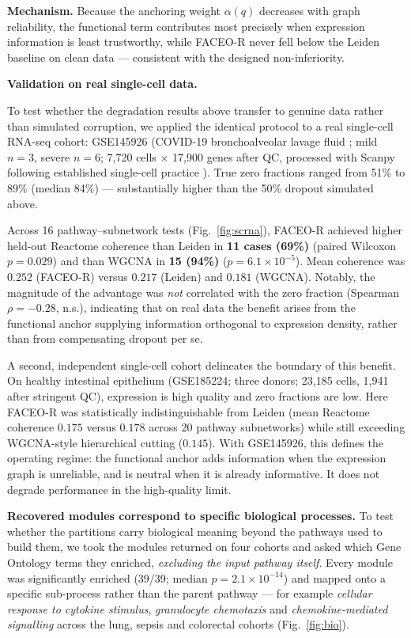 \documentclass[twocolumn,10pt,a4paper]{article}
\begin{document}
\noindent\textbf{Mechanism.} Because the anchoring weight $\alpha(q)$ decreases with graph
reliability, the functional term contributes most precisely when expression information is
least trustworthy, while FACEO-R never fell below the Leiden baseline on clean data ---
consistent with the designed non-inferiority.


\noindent\textbf{Validation on real single-cell data.} \label{sec:scrna}

To test whether the degradation results above transfer to genuine data rather than simulated
corruption, we applied the identical protocol to a real single-cell RNA-seq cohort: GSE145926
(COVID-19 bronchoalveolar lavage fluid \citep{liao2020covid}; mild $n=3$, severe $n=6$;
7{,}720 cells $\times$ 17{,}900 genes after QC, processed with Scanpy \citep{wolf2018scanpy} following established
single-cell practice \citep{luecken2019benchmark}). True zero fractions ranged
from 51\% to 89\% (median 84\%) ---
substantially higher than the 50\% dropout simulated above.

Across 16 pathway--subnetwork tests (Fig.~\ref{fig:scrna}), FACEO-R achieved higher
held-out Reactome coherence
than Leiden in \textbf{11 cases (69\%)} (paired Wilcoxon $p = 0.029$) and than WGCNA in
\textbf{15 (94\%)} ($p = 6.1\times10^{-5}$). Mean coherence was $0.252$ (FACEO-R) versus
$0.217$ (Leiden) and $0.181$ (WGCNA). Notably, the magnitude of the advantage was \emph{not}
correlated with the zero fraction (Spearman $\rho = -0.28$, n.s.), indicating that on real
data the benefit arises from the functional anchor supplying information orthogonal to
expression density, rather than from compensating dropout per se.

A second, independent single-cell cohort delineates the boundary of this benefit.
On healthy intestinal epithelium (GSE185224; three donors; 23{,}185 cells, 1{,}941 after
stringent QC), expression is high quality and zero fractions are low. Here FACEO-R was
statistically indistinguishable from Leiden
(mean Reactome coherence $0.175$ versus $0.178$ across 20 pathway subnetworks) while still
exceeding WGCNA-style hierarchical cutting ($0.145$). With GSE145926, this defines the
operating regime: the functional anchor adds information when the expression graph is
unreliable, and is neutral when it is already informative. It does not degrade performance
in the high-quality limit.

\noindent\textbf{Recovered modules correspond to specific biological processes.} To test
whether the partitions carry biological meaning beyond the pathways used to build them, we
took the modules returned on four cohorts and asked which Gene Ontology terms they enriched,
\emph{excluding the input pathway itself}. Every module was significantly enriched
(39/39; median $p = 2.1\times10^{-14}$) and mapped onto a specific sub-process rather than
the parent pathway --- for example \emph{cellular response to cytokine stimulus},
\emph{granulocyte chemotaxis} and \emph{chemokine-mediated signalling} across the lung,
sepsis and colorectal cohorts (Fig.~\ref{fig:bio}).
\end{document}

